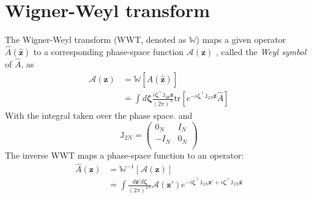 \documentclass{article}
\begin{document}
\section{Wigner-Weyl transform}
\label{appendix:Weyl}
The Wigner-Weyl transform (WWT, denoted as $\mathbb{W}$)
maps a given operator $\hat{A}(\hat{\mathbf{z}})$ to a corresponding phase-space function $\mathcal{A}(\mathbf{z})$ , called the 
\textit{Weyl symbol} of $\hat{A}$, as
\begin{eqnarray}
    \mathcal{A}(\mathbf{z}) &= \mathbb{W}[\hat{A}(\hat{\mathbf{z}})]\\
                            &\stackrel{.}{=} \int d\mathcal{\mathbf{\zeta} }\frac{i \mathbf{\zeta}^\intercal \mathtt{J_{2N}\mathbf{z}}}{(2\pi)^N} \text{tr}[e^{-i \mathbf{\zeta}^\intercal \mathtt{J}_{2N} \hat{\mathbf{z}}}\hat{A}]
\end{eqnarray}
With the integral taken over the phase space. and
\begin{equation}
    \mathtt{J}_{2N} = 
    \left(
    \begin{matrix}
        0_N & I_N\\
        -I_N & 0_N\\
    \end{matrix}
    \right)
\end{equation}
The inverse WWT maps a phase-space function to an operator:
\begin{eqnarray}
    \hat{A}(\mathbf{z}) &= \mathbb{W}^{-1}[\mathcal{A}(\mathbf{z})]\\
                        &\stackrel{.}{=} \int \frac{d\mathbf{z}'d\mathcal{\mathbf{\zeta} }}{(2\pi)^{2N}}\mathcal{A}(\mathbf{z}')e^{-i \mathbf{\zeta}^\intercal \mathtt{J}_{2N} \mathbf{z}' + i \mathbf{\zeta}^\intercal \mathtt{J}_{2N} \hat{\mathbf{z}}}
\end{eqnarray}
\end{document}
